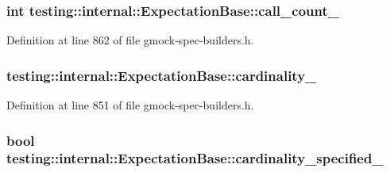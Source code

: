 \subsubsection[{\texorpdfstring{call\+\_\+count\+\_\+}{call_count_}}]{\setlength{\rightskip}{0pt plus 5cm}int testing\+::internal\+::\+Expectation\+Base\+::call\+\_\+count\+\_\+\hspace{0.3cm}{\ttfamily [protected]}}\hypertarget{classtesting_1_1internal_1_1_expectation_base_aea95d46f7583566e3f7a081b0668ad4c}{}\label{classtesting_1_1internal_1_1_expectation_base_aea95d46f7583566e3f7a081b0668ad4c}


Definition at line 862 of file gmock-\/spec-\/builders.\+h.

\subsubsection[{\texorpdfstring{cardinality\+\_\+}{cardinality_}}]{ testing\+::internal\+::\+Expectation\+Base\+::cardinality\+\_\+\hspace{0.3cm}{\ttfamily [protected]}}\hypertarget{classtesting_1_1internal_1_1_expectation_base_ad0aedcc01c0c9a998952a2b2f486595c}{}\label{classtesting_1_1internal_1_1_expectation_base_ad0aedcc01c0c9a998952a2b2f486595c}


Definition at line 851 of file gmock-\/spec-\/builders.\+h.

\subsubsection[{\texorpdfstring{cardinality\+\_\+specified\+\_\+}{cardinality_specified_}}]{\setlength{\rightskip}{0pt plus 5cm}bool testing\+::internal\+::\+Expectation\+Base\+::cardinality\+\_\+specified\+\_\+\hspace{0.3cm}{\ttfamily [protected]}}\hypertarget{classtesting_1_1internal_1_1_expectation_base_ad2ca7220ed1a395bd850ff06c500a402}{}\label{classtesting_1_1internal_1_1_expectation_base_ad2ca7220ed1a395bd850ff06c500a402}


